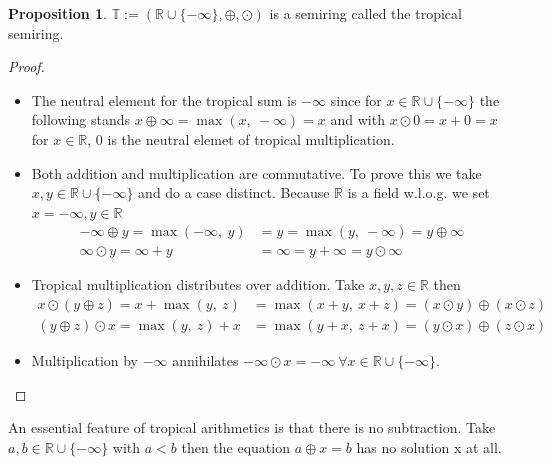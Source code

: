 \documentclass{article}
\theoremstyle{definition}
\newtheorem{proposition}[theorem]{Proposition}
\begin{document}
\begin{proposition}
$\mathbb{T} := ( \mathbb{R} \cup \{- \infty \} , \oplus , \odot )$ is a semiring called the tropical semiring. \cite[p.~10]{maclagan2015introduction}
\end{proposition}
\begin{proof}
~\
\begin{itemize}
\item[(1):]
The neutral element for the tropical sum is $- \infty$ since for $x \in \mathbb{R} \cup \{- \infty \}$ the following stands $ x \oplus \infty = \max(x,\ - \infty) = x$ and with $x \odot 0 = x + 0 = x$ for $x \in \mathbb{R}$, $0$ is the neutral elemet of tropical multiplication.
\item[(2):]
Both addition and multiplication are commutative. To prove this we take $x, y \in \mathbb{R} \cup \{- \infty \}$ and do a case distinct. Because $\mathbb{R}$ is a field w.l.o.g. we set $x= - \infty, y \in \mathbb{R}$
\begin{align*}
- \infty \oplus y = \max (- \infty ,\ y) &=   y = \max ( y,\ - \infty ) = y \oplus \infty \\
\infty \odot y = \infty +y &= \infty = y+ \infty = y \odot \infty
\end{align*}
\item[(3):]
Tropical multiplication distributes over addition. Take $x, y, z \in \mathbb{R}$ then
\begin{align*}
x \odot (y \oplus z) = x + \max (y,\ z) &=   \max (x + y,\ x + z) = (x \odot y) \oplus (x \odot z) \\
(y \oplus z) \odot x = \max (y,\ z) + x &=   \max (y + x,\ z + x) = (y \odot x) \oplus (z \odot x)
\end{align*}
\item[(4):]
Multiplication by $- \infty$ annihilates $- \infty \odot x = - \infty \: \forall x \in  \mathbb{R} \cup \{- \infty \}$.
\end{itemize}
\end{proof}

An essential feature of tropical arithmetics is that there is no subtraction. Take $a, b \in \mathbb{R} \cup \{- \infty \}$ with $a < b$ then the equation $a \oplus x=b$ has no solution x at all. \cite[p.~11]{maclagan2015introduction} \\ \\
\end{document}
